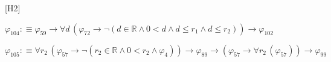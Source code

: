 \begin{fullproof}{[H2]}
\begin{abbrevlist}
\item $\varphi_{104} :\equiv \varphi_{59} \to \forall d\,(\varphi_{72} \to \neg (d \in \mathbb{R} \land 0 < d \land d \leq r_{1} \land d \leq r_{2})) \to \varphi_{102}$
\item $\varphi_{105} :\equiv \forall r_{2}\,(\varphi_{57} \to \neg (r_{2} \in \mathbb{R} \land 0 < r_{2} \land \varphi_{4})) \to \varphi_{89} \to (\varphi_{57} \to \forall r_{2}\,(\varphi_{57})) \to \varphi_{99}$
\end{abbrevlist}
\end{fullproof}
